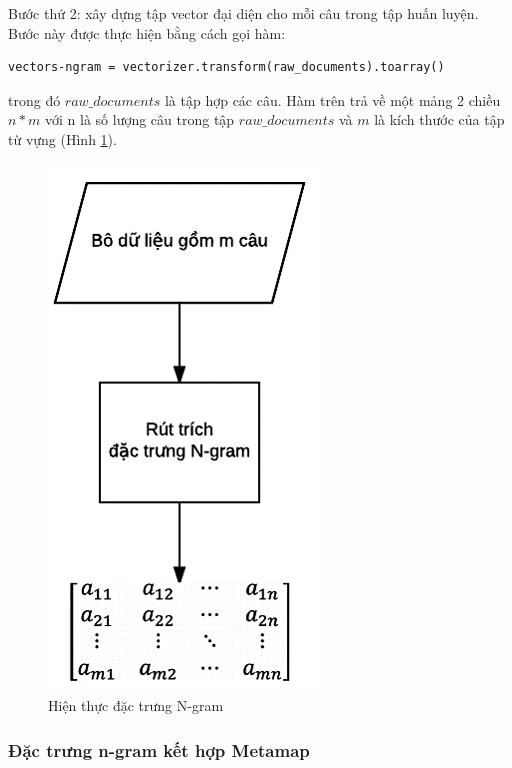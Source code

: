 Bước thứ 2: xây dựng tập vector đại diện cho mỗi câu trong tập huấn luyện. Bước này được thực hiện bằng cách gọi hàm:
\begin{lstlisting}
vectors-ngram = vectorizer.transform(raw_documents).toarray()
\end{lstlisting}
trong đó $raw\_documents$ là tập hợp các câu. Hàm trên trả về một mảng 2 chiều $n*m$ với n là số lượng câu trong tập $raw\_documents$ và $m$ là kích thước của tập từ vựng (Hình \ref{fig:hien-thuc-ngram}).
\begin{figure}[h]
\centering
\includegraphics[scale=0.5]{../hinh/hien_thuc_ngram.png}
\caption{Hiện thực đặc trưng N-gram} \label{fig:hien-thuc-ngram}
\end{figure}
\subsubsection*{Đặc trưng n-gram kết hợp Metamap}

